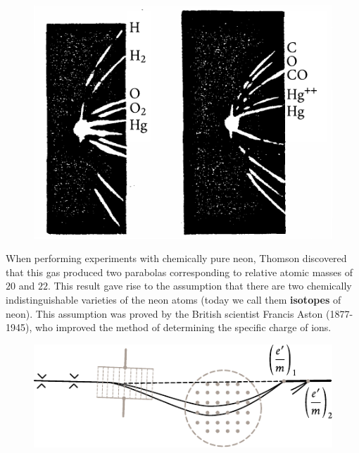 \begin{figure}[t]
	\begin{center}
		\includegraphics[scale=0.9]{figures/ch_10/fig_10_10.pdf}
		\caption[]{}
		\label{fig:10_10}
	\end{center}
	\vspace{-0.8cm}
\end{figure}

When performing experiments with chemically pure neon, Thomson discovered that this gas produced two parabolas corresponding to relative atomic masses of $20$ and $22$.
This result gave rise to the assumption that there are two chemically indistinguishable varieties of the neon atoms (today we call them \textbf{isotopes} of neon).
This assumption was proved by the British scientist Francis Aston (1877-1945), who improved the method of determining the specific charge of ions.

\begin{figure}[t]
	\begin{center}
		\includegraphics[scale=1]{figures/ch_10/fig_10_11.pdf}
		\caption[]{}
		\label{fig:10_11}
	\end{center}
	\vspace{-0.75cm}
\end{figure}

